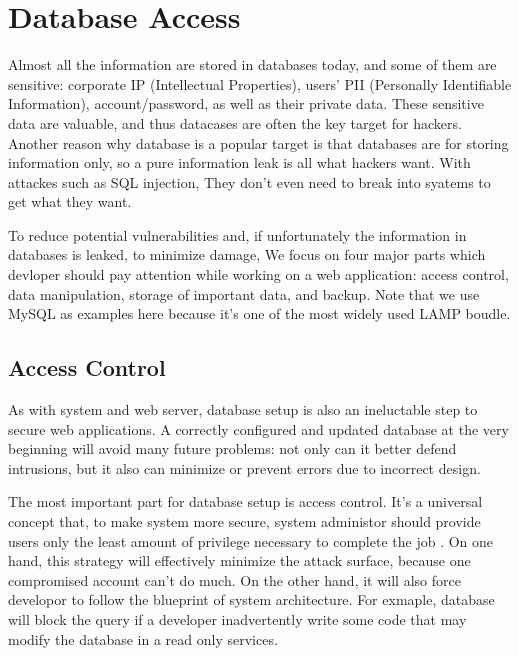 \documentclass[conference]{IEEEtran}
\begin{document}
\section{Database Access}
Almost all the information are stored in databases today,
and some of them are sensitive:
corporate IP (Intellectual Properties),
users' PII (Personally Identifiable Information),
account/password, as well as their private data.
These sensitive data are valuable, and thus
datacases are often the key target for hackers.
Another reason why database is a popular target
is that databases are for storing information only,
so a pure information leak is all what hackers want.
With attackes such as SQL injection,
They don't even need to break into syatems to get what they want.

To reduce potential vulnerabilities
and, if unfortunately the information in databases is leaked,
to minimize damage,
We focus on four major parts which devloper should pay attention
while working on a web application:
access control, data manipulation, storage of important data,
and backup.
Note that we use MySQL as examples here because it's one of
the most widely used LAMP \cite{LAMP} boudle.

\subsection{Access Control}
As with system and web server, database setup is also an ineluctable
step to secure web applications.
A correctly configured and updated database at the very beginning will
avoid many future problems:
not only can it better defend intrusions,
but it also can minimize or prevent errors due to incorrect design.

The most important part for database setup is access control.
It's a universal concept that, to make system more secure,
system administor should provide users
only the least amount of privilege necessary to complete the job \cite{least_privilege}.
On one hand,
this strategy will effectively minimize the attack surface,
because one compromised account can't do much.
On the other hand, it will also force developor to follow the blueprint of
system architecture.
For exmaple, database will block the query
if a developer inadvertently write some code
that may modify the database
in a read only services.
\end{document}
